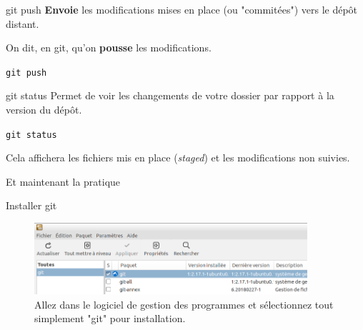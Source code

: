 \documentclass[svgnames,smaller]{beamer}
\begin{document}

\begin{frame}{git push}
\textbf{Envoie} les modifications mises en place (ou "commitées") vers le dépôt distant.

On dit, en git, qu'on \textbf{pousse} les modifications.

\begin{center}
\large
\texttt{git push}
\end{center}
\end{frame}


\begin{frame}{git status}
Permet de voir les changements de votre dossier par rapport à la version du dépôt.
\begin{center}
\large
\texttt{git status}
\end{center}

Cela affichera les fichiers mis en place (\textit{staged}) et les modifications non suivies.
\end{frame}


\begin{frame}[standout]
Et maintenant la pratique
\end{frame}


\begin{frame}{Installer git}
\begin{figure}
    \centering
    \includegraphics[width=0.9\textwidth]{images/git-software-manager.png}
    \caption{Allez dans le logiciel de gestion des programmes et sélectionnez tout simplement "git" pour installation.}
    \label{fig:git_software_manager}
\end{figure}
\end{frame}

\end{document}
